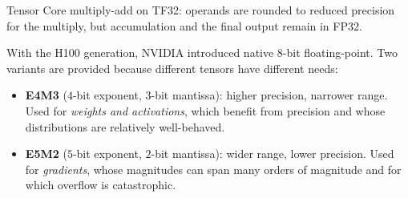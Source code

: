 \documentclass[11pt,a4paper]{article}
\theoremstyle{definition}
\theoremstyle{remark}
\theoremstyle{plain}
\begin{document}
\begin{center}
\par\smallskip
{\small Tensor Core multiply-add on TF32: operands are rounded to reduced
precision for the multiply, but accumulation and the final output remain
in FP32.}
\end{center}

\begin{description}[leftmargin=1.5em, style=nextline]
    \item[FP8 (E4M3 and E5M2).] With the H100 generation, NVIDIA
        introduced native $8$-bit floating-point. Two variants are
        provided because different tensors have different needs:
        \begin{itemize}[leftmargin=1.5em, itemsep=2pt]
            \item \textbf{E4M3} ($4$-bit exponent, $3$-bit mantissa):
                  higher precision, narrower range. Used for
                  \emph{weights and activations}, which benefit from
                  precision and whose distributions are relatively
                  well-behaved.
            \item \textbf{E5M2} ($5$-bit exponent, $2$-bit mantissa):
                  wider range, lower precision. Used for
                  \emph{gradients}, whose magnitudes can span many
                  orders of magnitude and for which overflow is
                  catastrophic.
        \end{itemize}
\end{description}
\end{document}
